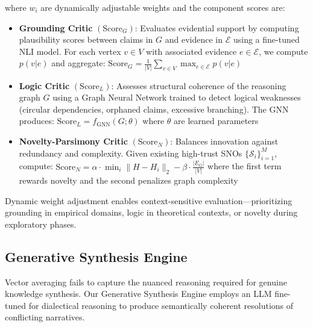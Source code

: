 \documentclass[12pt, a4paper]{article}
\begin{document}
where $w_i$ are dynamically adjustable weights and the component scores are:
\begin{itemize}
    \item \textbf{Grounding Critic} $(\text{Score}_G)$: Evaluates evidential support by computing plausibility scores between claims in $G$ and evidence in $\mathcal{E}$ using a fine-tuned NLI model. For each vertex $v \in V$ with associated evidence $e \in \mathcal{E}$, we compute $p(v|e)$ and aggregate: $\text{Score}_G = \frac{1}{|V|}\sum_{v \in V} \max_{e \in \mathcal{E}} p(v|e)$
    
    \item \textbf{Logic Critic} $(\text{Score}_L)$: Assesses structural coherence of the reasoning graph $G$ using a Graph Neural Network trained to detect logical weaknesses (circular dependencies, orphaned claims, excessive branching). The GNN produces: $\text{Score}_L = f_{\text{GNN}}(G; \theta)$ where $\theta$ are learned parameters
    
    \item \textbf{Novelty-Parsimony Critic} $(\text{Score}_N)$: Balances innovation against redundancy and complexity. Given existing high-trust SNOs $\{\mathcal{S}_i\}_{i=1}^M$, compute: $\text{Score}_N = \alpha \cdot \min_i \|H - H_i\|_2 - \beta \cdot \frac{|E_G|}{|V|}$ where the first term rewards novelty and the second penalizes graph complexity
\end{itemize}
Dynamic weight adjustment enables context-sensitive evaluation—prioritizing grounding in empirical domains, logic in theoretical contexts, or novelty during exploratory phases.

\subsection{Generative Synthesis Engine}
Vector averaging fails to capture the nuanced reasoning required for genuine knowledge synthesis. Our Generative Synthesis Engine employs an LLM fine-tuned for dialectical reasoning to produce semantically coherent resolutions of conflicting narratives.
\end{document}
